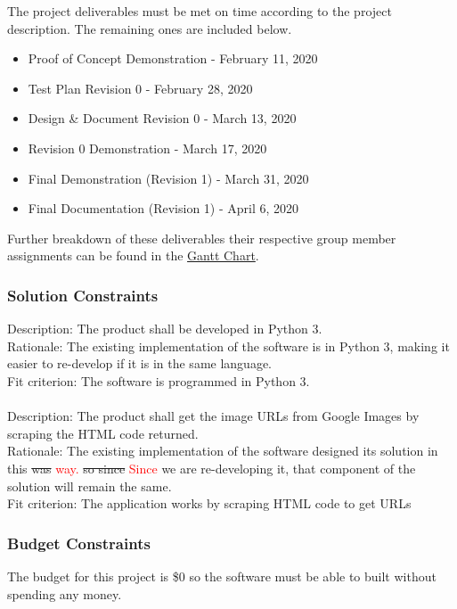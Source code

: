 \documentclass[12pt, titlepage]{article}
\begin{document}
The project deliverables must be met on time according to the project description. The remaining ones are included below.

\begin{itemize}
    \item Proof of Concept Demonstration - February 11, 2020
    \item Test Plan Revision 0 - February 28, 2020
    \item Design \& Document Revision 0 - March 13, 2020
    \item Revision 0 Demonstration - March 17, 2020
    \item Final Demonstration (Revision 1) - March 31, 2020
    \item Final Documentation (Revision 1) - April 6, 2020
\end{itemize}

Further breakdown of these deliverables their respective group member assignments can be found in the \href{https://gitlab.cas.mcmaster.ca/guinnesj/google-images-downloader/blob/master/ProjectSchedule/Gantt-Chart.pdf}{Gantt Chart}.

\subsubsection{Solution Constraints}

Description: The product shall be developed in Python 3.\\
Rationale: The existing implementation of the software is in Python 3, making it easier to re-develop if it is in the same language.\\
Fit criterion: The software is programmed in Python 3.
\\ \\
Description: The product shall get the image URLs from Google Images by scraping the HTML code returned.\\
Rationale: The existing implementation of the software designed its solution in this \st{was} \textcolor{red}{way.} \st{so since} \textcolor{red}{Since} we are re-developing it, that component of the solution will remain the same.\\
Fit criterion: The application works by scraping HTML code to get URLs

\subsubsection{Budget Constraints}

The budget for this project is \$0 so the software must be able to built without spending any money.
\end{document}
